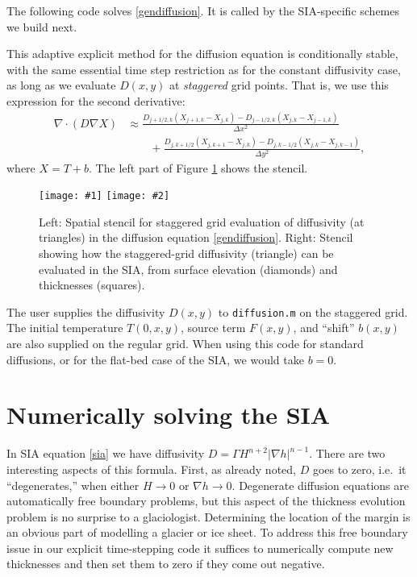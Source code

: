 \documentclass[letterpaper,final,12pt,reqno]{amsart}
\newcommand{\grad}{\nabla}
\newcommand{\Div}{\nabla\cdot}
\newcommand{\minput}[1]{
\vspace{0.8cm}
\VerbatimInput[frame=single,framesep=3mm,label=\fbox{\normalsize \textsl{\,#1.m\,}},fontfamily=courier,fontsize=\footnotesize]{tmp/#1.slim.m}
\vspace{0.5cm}
}
\newcommand{\twofigsizes}[5]{
\begin{figure}[ht]
\centering
\texttt{[image: \#1]} \quad
\texttt{[image: \#2]}
\caption{#3}
\label{fig:#1}
\end{figure}}
\begin{document}
The following code solves \eqref{gendiffusion}.  It is called by the SIA-specific schemes we build next.

\minput{diffusion}

This adaptive explicit method for the diffusion equation is conditionally stable, with the same essential time step restriction as for the constant diffusivity case, as long as we evaluate $D(x,y)$ at \emph{staggered} grid points.  That is, we use this expression for the second derivative:
\begin{align*}
\Div \left(D \grad X\right) &\approx \frac{D_{j+1/2,k}(X_{j+1,k} - X_{j,k}) - D_{j-1/2,k}(X_{j,k} - X_{j-1,k})}{\Delta x^2} \\
	&\qquad + \frac{D_{j,k+1/2}(X_{j,k+1} - X_{j,k}) - D_{j,k-1/2}(X_{j,k} - X_{j,k-1})}{\Delta y^2},
\end{align*}
where $X=T+b$.  The left part of Figure \ref{fig:diffstencil} shows the stencil.

\twofigsizes{diffstencil}{mahaffystencil}{Left:  Spatial stencil for staggered grid evaluation of diffusivity (at triangles) in the diffusion equation \eqref{gendiffusion}.  Right: Stencil showing how the staggered-grid diffusivity (triangle) can be evaluated in the SIA, from surface elevation (diamonds) and thicknesses (squares).}{2.2in}{2.2in}

The user supplies the diffusivity $D(x,y)$ to \texttt{diffusion.m} on the staggered grid.  The initial temperature $T(0,x,y)$, source term $F(x,y)$, and ``shift'' $b(x,y)$ are also supplied on the regular grid.  When using this code for standard diffusions, or for the flat-bed case of the SIA, we would take $b=0$.


\section{Numerically solving the SIA} \label{sec:numericalsia}

In SIA equation \eqref{sia} we have diffusivity $D = \Gamma H^{n+2} |\grad h|^{n-1}$.  There are two interesting aspects of this formula.  First, as already noted, $D$ goes to zero, i.e.~it ``degenerates,'' when either $H\to 0$ or $\grad h \to 0$.  Degenerate diffusion equations are automatically free boundary problems, but this aspect of the thickness evolution problem is no surprise to a glaciologist.  Determining the location of the margin is an obvious part of modelling a glacier or ice sheet.  To address this free boundary issue in our explicit time-stepping code it suffices to numerically compute new thicknesses and then set them to zero if they come out negative.
\end{document}
